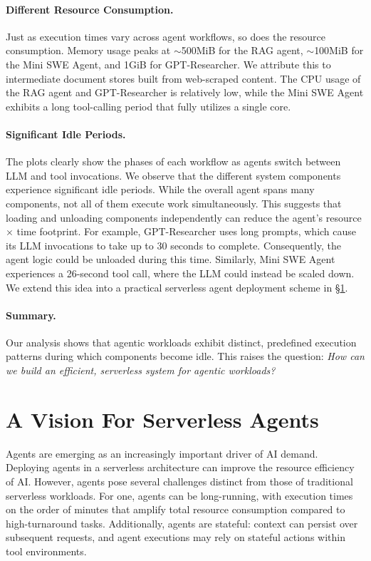 \paragraph{Different Resource Consumption.}
Just as execution times vary across agent workflows, so does the resource consumption.
Memory usage peaks at $\sim$500MiB for the RAG agent, $\sim$100MiB for the Mini SWE Agent, and 1GiB for GPT-Researcher.
We attribute this to intermediate document stores built from web-scraped content.
The CPU usage of the RAG agent and GPT-Researcher is relatively low, while the Mini SWE Agent exhibits a long tool-calling period that fully utilizes a single core.

\paragraph{Significant Idle Periods.}
The plots clearly show the phases of each workflow as agents switch between LLM and tool invocations.
We observe that the different system components experience significant idle periods. 
While the overall agent spans many components, not all of them execute work simultaneously. 
This suggests that loading and unloading components independently can reduce the agent's resource $\times$ time footprint.
For example, GPT-Researcher uses long prompts, which cause its LLM invocations to take up to 30 seconds to complete.
Consequently, the agent logic could be unloaded during this time.
Similarly, Mini SWE Agent experiences a 26-second tool call, where the LLM could instead be scaled down.
We extend this idea into a practical serverless agent deployment scheme in \S\ref{section:serverless_agents}.

\paragraph{Summary.}

Our analysis shows that agentic workloads exhibit distinct, predefined execution patterns during which components become idle. 
This raises the question: \emph{How can we build an efficient, serverless system for agentic workloads?}

\section{A Vision For Serverless Agents}
\label{section:serverless_agents}


Agents are emerging as an increasingly important driver of AI demand.
Deploying agents in a serverless architecture can improve the resource efficiency of AI.
However, agents pose several challenges distinct from those of traditional serverless workloads.
For one, agents can be long-running, with execution times on the order of minutes that amplify total resource consumption compared to high-turnaround tasks.
Additionally, agents are stateful: context can persist over subsequent requests, and agent executions may rely on stateful actions within tool environments.

